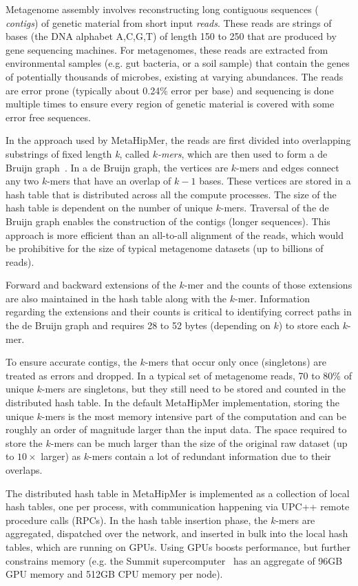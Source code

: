 Metagenome assembly involves reconstructing long contiguous sequences ({\it
contigs}) of genetic material from short input {\it reads}. These reads are
strings of bases (the DNA alphabet A,C,G,T) of length 150 to 250 that are
produced by gene sequencing machines.  For metagenomes, these reads are
extracted from environmental samples (e.g. gut bacteria, or a soil sample) that
contain the genes of potentially thousands of microbes, existing at varying
abundances.  The reads are error prone (typically about 0.24\% error per base)
and sequencing is done multiple times to ensure every region of genetic material
is covered with some error free sequences.

In the approach used by MetaHipMer, the reads are first divided into overlapping
substrings of fixed length {\it k}, called {\it $k$-mers}, which are then used
to form a de Bruijn graph~\cite{CompeauPeTe11}. In a de Bruijn graph, the
vertices are $k$-mers and edges connect any two $k$-mers that have an overlap of
$k-1$ bases. These vertices are stored in a hash table that is distributed
across all the compute processes.  The size of the hash table is dependent on
the number of unique $k$-mers.  Traversal of the de Bruijn graph enables the
construction of the contigs (longer sequences).  This approach is more efficient
than an all-to-all alignment of the reads, which would be prohibitive for the
size of typical metagenome datasets (up to billions of reads).

Forward and backward extensions of the $k$-mer and the counts of those
extensions are also maintained in the hash table along with the $k$-mer.
Information regarding the extensions and their counts is critical to identifying
correct paths in the de Bruijn graph and requires 28 to 52 bytes (depending on
$k$) to store each $k$-mer.

To ensure accurate contigs, the $k$-mers that occur only once (singletons) are
treated as errors and dropped. In a typical set of metagenome reads, 70 to 80\%
of unique $k$-mers are singletons, but they still need to be stored and counted
in the distributed hash table. In the default MetaHipMer implementation, storing
the unique $k$-mers is the most memory intensive part of the computation and can
be roughly an order of magnitude larger than the input data.  The space required
to store the $k$-mers can be much larger than the size of the original raw
dataset (up to $10\times$ larger) as $k$-mers contain a lot of redundant
information due to their overlaps.

The distributed hash table in MetaHipMer is implemented as a collection of local
hash tables, one per process, with communication happening via UPC++ remote
procedure calls (RPCs). In the hash table insertion phase, the $k$-mers are
aggregated, dispatched over the network, and inserted in bulk into the local
hash tables, which are running on GPUs. Using GPUs boosts performance, but
further constrains memory (e.g. the Summit supercomputer~\cite{VazhkudaiDBG18}
has an aggregate of 96GB GPU memory and 512GB CPU memory per node).

